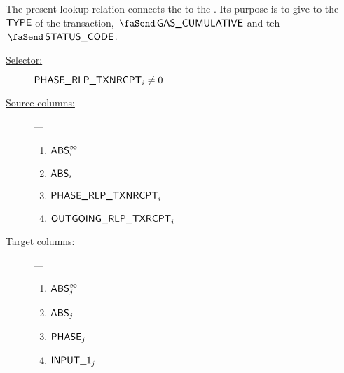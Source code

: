 The present lookup relation connects the \userTxnDataMod{} to the \rlpTxnRcptMod{}. Its purpose is to give to \rlpTxnRcptMod{} the $\textsf{TYPE}$ of the transaction, $\txCumulativeConsumedGas$ and teh $\txStatusCode$.
\begin{description}
	\item[\underline{Selector:}] $\textsf{PHASE\_RLP\_TXNRCPT}_{i} \neq 0$
	\item[\underline{Source columns:}] ---
		\begin{multicols}{2}
			\begin{enumerate}
				\item $\textsf{ABS}^\infty_{i}$
				\item $\textsf{ABS}_{i}$
				\item $\textsf{PHASE\_RLP\_TXNRCPT}_{i}$
				\item $\textsf{OUTGOING\_RLP\_TXRCPT}_{i}$
			\end{enumerate}
		\end{multicols}
	\item[\underline{Target columns:}] ---
		\begin{multicols}{2}
			\begin{enumerate}
				\item $\textsf{ABS}^\infty_{j}$
				\item $\textsf{ABS}_{j}$
				\item $\textsf{PHASE}_{j}$
				\item $\textsf{INPUT\_1}_{j}$
			\end{enumerate}
		\end{multicols}
\end{description}
